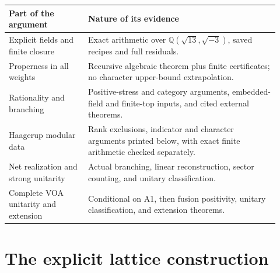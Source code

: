 \documentclass[11pt,a4paper]{article}
\theoremstyle{definition}
\newcommand{\QQ}{\mathbb Q}
\begin{document}
\begin{center}
\begin{tabular}{@{}p{0.27\linewidth}p{0.65\linewidth}@{}}
\toprule
Part of the argument & Nature of its evidence \\
\midrule
Explicit fields and finite closure & Exact arithmetic over
\(\QQ(\sqrt{13},\sqrt{-3})\), saved recipes and full residuals.\\
Properness in all weights & Recursive algebraic theorem plus finite
certificates; no character upper-bound extrapolation.\\
Rationality and branching & Positive-stress and category arguments,
embedded-field and finite-top inputs, and cited external theorems.\\
Haagerup modular data & Rank exclusions, indicator and character
arguments printed below, with exact finite arithmetic checked separately.\\
Net realization and strong unitarity & Actual branching, linear
reconstruction, sector counting, and unitary classification.\\
Complete VOA unitarity and extension & Conditional on A1, then fusion
positivity, unitary classification, and extension theorems.\\
\bottomrule
\end{tabular}
\end{center}

\section{The explicit lattice construction}\label{sec:construction}
\end{document}
